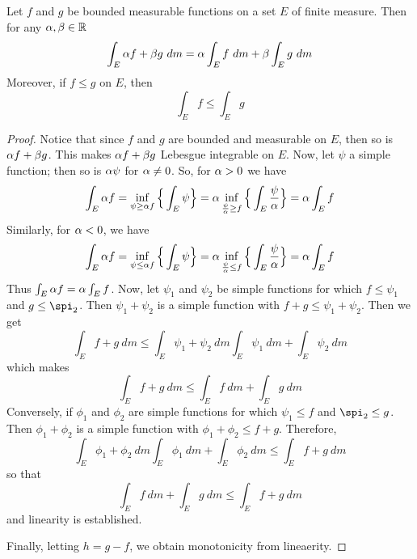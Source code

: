 \begin{theorem}\label{10.1.5}
    Let $f$ and  $g$ be bounded measurable functions on a set  $E$ of finite
    measure. Then for any  $\alpha,\beta \in \mathbb{R}$
    \begin{equation*}
        \int_E{\a{f}+\b{g} \ dm}=\a\int_E{f \ dm}+\b\int_E{g \ dm}
    \end{equation*}
    Moreover, if $f \leq g$ on  $E$, then
    \begin{equation*}
        \int_E{f} \leq \int_E{g}
    \end{equation*}
\end{theorem}
\begin{proof}
    Notice that since $f$ and  $g$ are bounded and measurable on $E$, then so is
    $\alpha{f}+\beta{g}$. This makes $\alpha{f}+\beta{g}$ Lebesgue integrable on $E$. Now, let
    $\psi$ a simple function; then so is  $\alpha\psi$ for $\alpha \neq 0$. So, for
    $\alpha>0$ we have
    \begin{equation*}
        \int_E{\alpha{f}}=\inf_{\psi \geq \alpha{f}}{\Big{\{} \int_E{\psi} \Big{\}}}=
        \alpha\inf_{\frac{\psi}{\alpha} \geq {f}}{\Big{\{} \int_E{\frac{\psi}{\alpha}} \Big{\}}}=
        \alpha\int_E{f}
    \end{equation*}
    Similarly, for $\alpha<0$, we have
    \begin{equation*}
        \int_E{\alpha{f}}=\inf_{\psi \leq \alpha{f}}{\Big{\{} \int_E{\psi} \Big{\}}}=
        \alpha\inf_{\frac{\psi}{\alpha} \leq {f}}{\Big{\{} \int_E{\frac{\psi}{\alpha}} \Big{\}}}=
        \alpha\int_E{f}
    \end{equation*}
    Thus $\int_E{\alpha{f}}=\alpha\int_E{f}$. Now, let $\psi_1$  and $\psi_2$ be simple
    functions for which $f \leq \psi_1$ and $g \leq \spi_2$. Then
    $\psi_1+\psi_2$ is a simple function with $f+g \leq \psi_1+\psi_2$. Then we
    get
    \begin{equation*}
        \int_E{f+g \ dm} \leq \int_E{\psi_1+\psi_2 \ dm}\int_E{\psi_1  \ dm}+
                        \int_E{\psi_2 \ dm}
    \end{equation*}
    which makes
    \begin{equation*}
        \int_E{f+g \ dm} \leq \int_E{f \ dm}+\int_E{g \ dm}
    \end{equation*}
    Conversely, if $\phi_1$  and $\phi_2$ are simple functions for which
    $\psi_1 \leq f$ and $\spi_2 \leq g$. Then $\phi_1+\phi_2$ is a simple
    function with $\phi_1+\phi_2 \leq f+g$. Therefore,
    \begin{equation*}
        \int_E{\phi_1+\phi_2 \ dm}\int_E{\phi_1  \ dm}+ \int_E{\phi_2 \ dm} \leq
        \int_E{f+g \ dm}
    \end{equation*}
    so that
    \begin{equation*}
         \int_E{f \ dm}+\int_E{g \ dm} \leq \int_E{f+g \ dm}
    \end{equation*}
    and linearity is established.

    Finally, letting $h=g-f$, we obtain monotonicity from lineaerity.
\end{proof}
